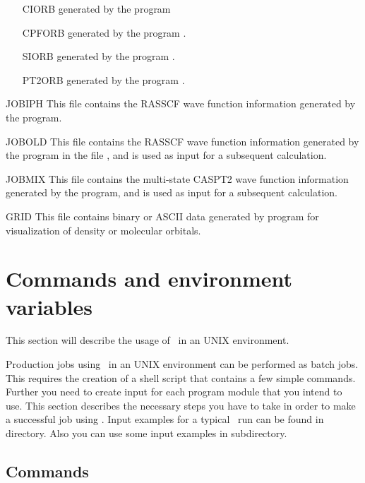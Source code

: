 \begin{filelist}
\begin{itemize}
\item[CIORB] generated by the program 
\item[CPFORB] generated by the program .
\item[SIORB] generated by the program .
\item[PT2ORB] generated by the program .
\end{itemize}
\item[JOBIPH]
This file contains the RASSCF wave function information generated by the
 program.
\item[JOBOLD]
This file contains the RASSCF wave function information generated by the
 program in the file , and is used as input for a
 subsequent  calculation.
\item[JOBMIX]
This file contains the multi-state CASPT2 wave function information
generated by the
 program, and is used as input for a
 subsequent  calculation.
\item[GRID]
This file contains binary or ASCII data generated by
 program for visualization of density or
molecular orbitals.
\end{filelist}

\section{Commands and environment variables}

This section will describe the usage of \molcas\ in an
UNIX environment.

Production jobs using \molcas\ in an UNIX environment can be
performed as batch jobs.
This requires the creation of a shell script that
contains a few simple commands. Further you need to create input for
each program module that you intend to use. This section describes the
necessary steps you have to take in order to make a successful job using
\molcas.
Input examples for a typical \molcas\
run can be found in  directory.
Also you can use some input examples
in  subdirectory.

\subsection{Commands}

